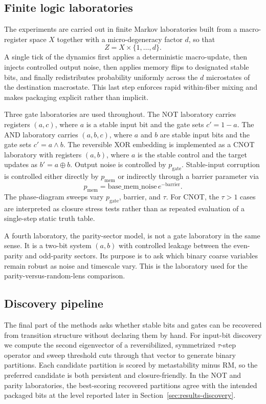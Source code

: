 \documentclass[11pt]{article}
\theoremstyle{definition}
\begin{document}
\subsection{Finite logic laboratories}

The experiments are carried out in finite Markov laboratories built from a macro-register space \(X\) together with a micro-degeneracy factor \(d\), so that
\[
Z = X \times \{1,\dots,d\}.
\]
A single tick of the dynamics first applies a deterministic macro-update, then injects controlled output noise, then applies memory flips to designated stable bits, and finally redistributes probability uniformly across the \(d\) microstates of the destination macrostate. This last step enforces rapid within-fiber mixing and makes packaging explicit rather than implicit.

Three gate laboratories are used throughout. The NOT laboratory carries registers \((a,c)\), where \(a\) is a stable input bit and the gate sets \(c' = 1-a\). The AND laboratory carries \((a,b,c)\), where \(a\) and \(b\) are stable input bits and the gate sets \(c' = a \wedge b\). The reversible XOR embedding is implemented as a CNOT laboratory with registers \((a,b)\), where \(a\) is the stable control and the target updates as \(b' = a \oplus b\). Output noise is controlled by \(p_{\mathrm{gate}}\). Stable-input corruption is controlled either directly by \(p_{\mathrm{mem}}\) or indirectly through a barrier parameter via
\[
p_{\mathrm{mem}} = \text{base\_mem\_noise}\,e^{-\text{barrier}}.
\]
The phase-diagram sweeps vary \(p_{\mathrm{gate}}\), barrier, and \(\tau\). For CNOT, the \(\tau>1\) cases are interpreted as closure stress tests rather than as repeated evaluation of a single-step static truth table.

A fourth laboratory, the parity-sector model, is not a gate laboratory in the same sense. It is a two-bit system \((a,b)\) with controlled leakage between the even-parity and odd-parity sectors. Its purpose is to ask which binary coarse variables remain robust as noise and timescale vary. This is the laboratory used for the parity-versus-random-lens comparison.

\subsection{Discovery pipeline}

The final part of the methods asks whether stable bits and gates can be recovered from transition structure without declaring them by hand. For input-bit discovery we compute the second eigenvector of a reversibilized, symmetrized \(\tau\)-step operator and sweep threshold cuts through that vector to generate binary partitions. Each candidate partition is scored by metastability minus RM, so the preferred candidate is both persistent and closure-friendly. In the NOT and parity laboratories, the best-scoring recovered partitions agree with the intended packaged bits at the level reported later in Section~\ref{sec:results-discovery}.
\end{document}
